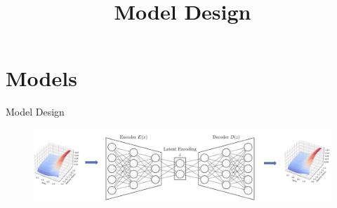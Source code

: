 \documentclass{beamer}
\begin{document}
\section{Models}

\begin{frame}{Model Design}
    \begin{figure}
    \centering
    \includegraphics[width=0.9\linewidth]{docs/slides/img/model_design_full.png}
    \title{Model Design}
\end{figure}

\end{frame}
\end{document}
